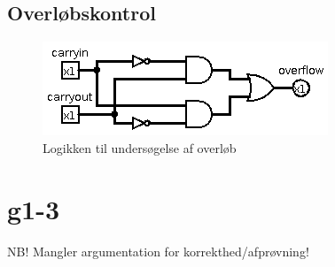 \documentclass[10pt,a4paper,danish]{article}
\begin{document}
\subsection{Overløbskontrol}
\begin{figure}[htb]
\begin{center}
\leavevmode
\includegraphics[scale=0.70]{overflow-detection.png}
\end{center}
\caption{Logikken til undersøgelse af overløb}
\label{fig:overflow}
\end{figure}

\section{g1-3}


\paragraph{}
NB! Mangler argumentation for korrekthed/afprøvning!
\end{document}
